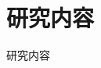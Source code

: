 \documentclass[10pt,aspectratio=43,mathserif,UTF8]{beamer}
\begin{document}


	
%



\section{研究内容}


\begin{frame}
	\Huge{\centerline{研究内容}}
\end{frame}


\end{document}
